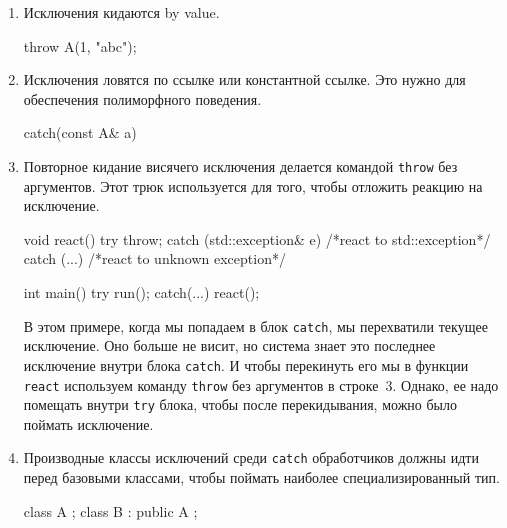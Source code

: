 \begin{enumerate}
\item Исключения кидаются by value.
\begin{cppcode}
throw A(1, "abc");
\end{cppcode}

\item Исключения ловятся по ссылке или константной ссылке.
Это нужно для обеспечения полиморфного поведения.
\begin{cppcode}
catch(const A& a)
\end{cppcode}

\item Повторное кидание висячего исключения делается командой \verb"throw" без аргументов.
Этот трюк используется для того, чтобы отложить реакцию на исключение.
\begin{cppcode}
void react() {
  try {
    throw;
  } catch (std::exception& e) {
    /*react to std::exception*/
  } catch (...) {
    /*react to unknown exception*/
  }
}

int main() {
  try {
    run();
  } catch(...) {
    react();
  }
}
\end{cppcode}
В этом примере, когда мы попадаем в блок \verb"catch", мы перехватили текущее исключение.
Оно больше не висит, но система знает это последнее исключение внутри блока \verb"catch".
И чтобы перекинуть его мы в функции \verb"react" используем команду \verb"throw" без аргументов в строке~3.
Однако, ее надо помещать внутри \verb"try" блока, чтобы после перекидывания, можно было поймать исключение.

\item Производные классы исключений среди \verb"catch" обработчиков должны идти перед базовыми классами, чтобы поймать наиболее специализированный тип.
\begin{cppcode}
class A {};
class B : public A {};


\end{cppcode}
\end{enumerate}
